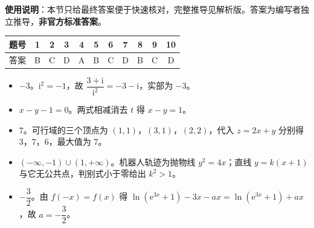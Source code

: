 
\begin{gknotice}
\textbf{使用说明}：本节只给最终答案便于快速核对，完整推导见解析版。答案为编写者独立推导，\textbf{非官方标准答案}。
\end{gknotice}

\begin{center}\begin{tabular}{ccccccccccc}
\toprule
题号 & 1 & 2 & 3 & 4 & 5 & 6 & 7 & 8 & 9 & 10 \\
\midrule
答案 & B & C & D & A & B & C & D & B & C & D \\
\bottomrule
\end{tabular}\end{center}

\begin{itemize}[leftmargin=2.6em]
  \item[\textbf{11.}] $-3$。$\mathrm i^2=-1$，故 $\dfrac{3+\mathrm i}{\mathrm i^2}=-3-\mathrm i$，实部为 $-3$。
  \item[\textbf{12.}] $x-y-1=0$。两式相减消去 $t$ 得 $x-y=1$。
  \item[\textbf{13.}] $7$。可行域的三个顶点为 $(1,1)$，$(3,1)$，$(2,2)$，代入 $z=2x+y$ 分别得 $3$，$7$，$6$，最大值为 $7$。
  \item[\textbf{14.}] $(-\infty,-1)\cup(1,+\infty)$。机器人轨迹为抛物线 $y^2=4x$；直线 $y=k(x+1)$ 与它无公共点，判别式小于零给出 $k^2>1$。
  \item[\textbf{15.}] $-\dfrac32$。由 $f(-x)=f(x)$ 得 $\ln(\mathrm e^{3x}+1)-3x-ax=\ln(\mathrm e^{3x}+1)+ax$，故 $a=-\dfrac32$。
\end{itemize}

